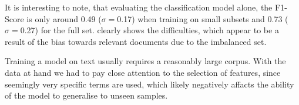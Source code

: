 It is interesting to note, that evaluating the classification model alone, the F1-Score is only around 0.49 ($\sigma=$0.17) when training on small subsets and 0.73 ($\sigma=$0.27) for the full set.  clearly shows the difficulties, which appear to be a result of the bias towards relevant documents due to the imbalanced set.

Training a model on text usually requires a reasonably large corpus. With the data at hand we had to pay close attention to the selection of features, since seemingly very specific terms are used, which likely negatively affacts the ability of the model to generalise to unseen samples.

%
%

